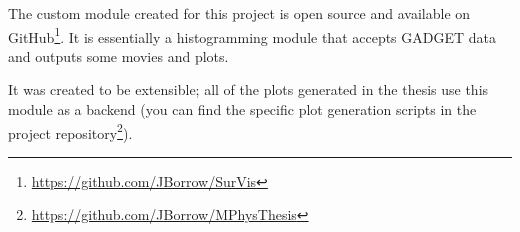 The custom \sv module created for this project is open source and available on GitHub\footnote{\url{https://github.com/JBorrow/SurVis}}.
It is essentially a histogramming module that accepts GADGET data and outputs some movies and plots.

It was created to be extensible; all of the plots generated in the thesis use this module as a backend (you can find the specific plot generation scripts in the project repository\footnote{\url{https://github.com/JBorrow/MPhysThesis}}).
